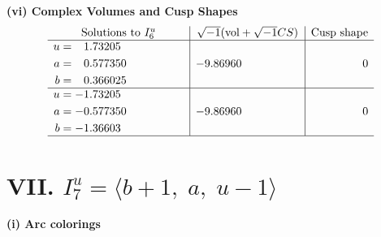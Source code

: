 \documentclass[1p]{elsarticle_modified}
\theoremstyle{definition}
\newcommand{\I}{\sqrt{-1}}
\begin{document}
\newpage\flushleft \textbf{(vi) Complex Volumes and Cusp Shapes}
$$\begin{array}{c|c|c}  
\text{Solutions to }I^u_{6}& \I (\text{vol} + \sqrt{-1}CS) & \text{Cusp shape}\\
 \hline 
\begin{aligned}
u &= \phantom{-}1.73205\phantom{ +0.000000I} \\
a &= \phantom{-}0.577350\phantom{ +0.000000I} \\
b &= \phantom{-}0.366025\phantom{ +0.000000I}\end{aligned}
 & -9.86960\phantom{ +0.000000I} & \phantom{-0.000000 } 0 \\ \hline\begin{aligned}
u &= -1.73205\phantom{ +0.000000I} \\
a &= -0.577350\phantom{ +0.000000I} \\
b &= -1.36603\phantom{ +0.000000I}\end{aligned}
 & -9.86960\phantom{ +0.000000I} & \phantom{-0.000000 } 0\\
 \hline 
 \end{array}$$\newpage\newpage\renewcommand{\arraystretch}{1}
\centering \section*{VII. $I^u_{7}= \langle b+1,\;a,\;u-1 \rangle$}
\flushleft \textbf{(i) Arc colorings}\\
\end{document}
